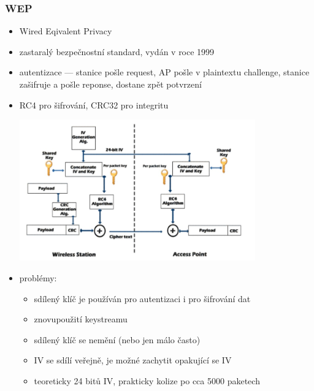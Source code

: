 \subsubsection*{WEP}
\begin{itemize}
	\item Wired Eqivalent Privacy
	\item zastaralý bezpečnostní standard, vydán v roce 1999
	\item autentizace --- stanice pošle request, AP pošle v plaintextu challenge, stanice zašifruje a pošle reponse, dostane zpět potvrzení
	\item RC4 pro šifrování, CRC32 pro integritu
	
	\includegraphics[width=0.8\textwidth]{img/OB-13_2.jpg}
	
	\item problémy:
	\begin{itemize}
		\item sdílený klíč je používán pro autentizaci i pro šifrování dat
		\item znovupoužití keystreamu
		\item sdílený klíč se nemění (nebo jen málo často)
		\item IV se sdílí veřejně, je možné zachytit opakující se IV
		\item teoreticky 24 bitů IV, prakticky kolize po cca 5000 paketech
	\end{itemize}
\end{itemize}

